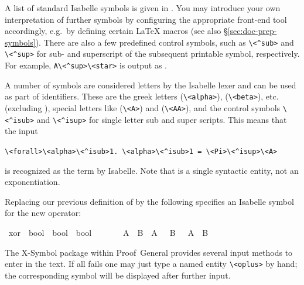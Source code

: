 \begin{isabellebody}
\begin{isamarkuptext}
  A list of standard Isabelle symbols is given in
  \cite{isabelle-isar-ref}.  You may introduce your own
  interpretation of further symbols by configuring the appropriate
  front-end tool accordingly, e.g.\ by defining certain {\LaTeX}
  macros (see also \S\ref{sec:doc-prep-symbols}).  There are also a
  few predefined control symbols, such as \verb,\,\verb,<^sub>, and
  \verb,\,\verb,<^sup>, for sub- and superscript of the subsequent
  printable symbol, respectively.  For example, \verb,A\<^sup>\<star>, is
  output as .

  A number of symbols are considered letters by the Isabelle lexer and
  can be used as part of identifiers. These are the greek letters
  \isa{{\isasymalpha}} (\verb+\+\verb+<alpha>+), \isa{{\isasymbeta}}
  (\verb+\+\verb+<beta>+), etc. (excluding \isa{{\isasymlambda}}),
  special letters like \isa{{\isasymA}} (\verb+\+\verb+<A>+) and \isa{{\isasymAA}} (\verb+\+\verb+<AA>+), and the control symbols
  \verb+\+\verb+<^isub>+ and \verb+\+\verb+<^isup>+ for single letter
  sub and super scripts. This means that the input

  \medskip
  {\small\noindent \verb,\,\verb,<forall>\,\verb,<alpha>\<^isub>1.,~\verb,\,\verb,<alpha>\<^isub>1 = \,\verb,<Pi>\<^isup>\<A>,}

  \medskip
  \noindent is recognized as the term  
  by Isabelle. Note that \isa{{\isasymPi}\isactrlisup {\isasymA}} is a single
  syntactic entity, not an exponentiation.

  Replacing our previous definition of  by the
  following specifies an Isabelle symbol for the new operator:%
\end{isamarkuptext}%
\isamarkuptrue%
%
\isadelimML
%
\endisadelimML
%
\isatagML
%
\endisatagML
{\isafoldML}%
%
\isadelimML
%
\endisadelimML
{}\isamarkupfalse%
\ xor\ {\isacharcolon}{\isacharcolon}\ {\isachardoublequoteopen}bool\ {\isasymRightarrow}\ bool\ {\isasymRightarrow}\ bool{\isachardoublequoteclose}\ \ \ \ {\isacharparenleft}\ {\isachardoublequoteopen}{\isasymoplus}{\isachardoublequoteclose}\ {}{}{\isacharparenright}\isanewline
{}\ {\isachardoublequoteopen}A\ {\isasymoplus}\ B\ {\isasymequiv}\ {\isacharparenleft}A\ {\isasymand}\ {\isasymnot}\ B{\isacharparenright}\ {\isasymor}\ {\isacharparenleft}{\isasymnot}\ A\ {\isasymand}\ B{\isacharparenright}{\isachardoublequoteclose}%
\isadelimML
%
\endisadelimML
%
\isatagML
%
\endisatagML
{\isafoldML}%
%
\isadelimML
%
\endisadelimML
%
\begin{isamarkuptext}%
\noindent The X-Symbol package within Proof~General provides several
  input methods to enter \isa{{\isasymoplus}} in the text.  If all fails one may
  just type a named entity \verb,\,\verb,<oplus>, by hand; the
  corresponding symbol will be displayed after further input.


\end{isamarkuptext}
\end{isabellebody}

